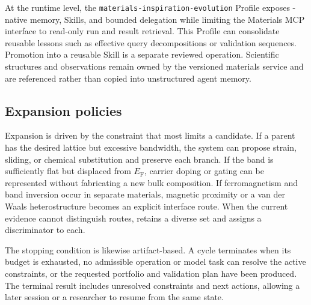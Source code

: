 At the runtime level, the \texttt{materials-inspiration-evolution} Profile exposes \hermes-native memory, Skills, and bounded delegation while limiting the Materials MCP interface to read-only run and result retrieval.  This Profile can consolidate reusable lessons such as effective query decompositions or validation sequences.  Promotion into a reusable Skill is a separate reviewed operation.  Scientific structures and observations remain owned by the versioned materials service and are referenced rather than copied into unstructured agent memory.

\subsection{Expansion policies}

Expansion is driven by the constraint that most limits a candidate.  If a parent has the desired lattice but excessive bandwidth, the system can propose strain, sliding, or chemical substitution and preserve each branch.  If the band is sufficiently flat but displaced from $E_\mathrm{F}$, carrier doping or gating can be represented without fabricating a new bulk composition.  If ferromagnetism and band inversion occur in separate materials, magnetic proximity or a van der Waals heterostructure becomes an explicit interface route.  When the current evidence cannot distinguish routes, \matevolve retains a diverse set and assigns a discriminator to each.

The stopping condition is likewise artifact-based.  A cycle terminates when its budget is exhausted, no admissible operation or model task can resolve the active constraints, or the requested portfolio and validation plan have been produced.  The terminal result includes unresolved constraints and next actions, allowing a later \hermes session or a researcher to resume from the same state.
